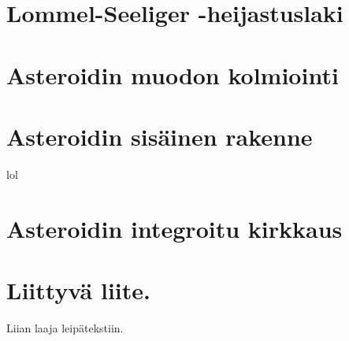 \documentclass[12pt,a4paper,titlepage]{article}
\begin{document}
\section{Lommel-Seeliger -heijastuslaki}


\section{Asteroidin muodon kolmiointi}


\section{Asteroidin sisäinen rakenne}
lol

\section{Asteroidin integroitu kirkkaus}





\appendix
\newpage
\section{Liittyvä liite.} \label{koodi}
Liian laaja leipätekstiin.
\end{document}
